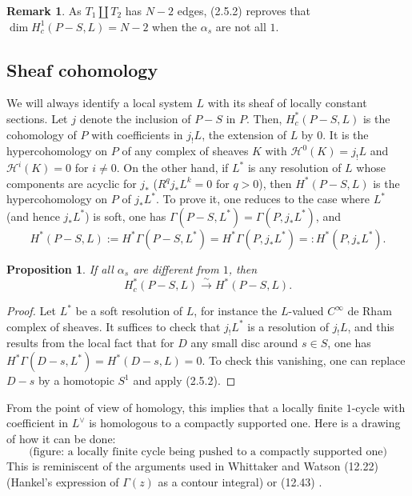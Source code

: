 \documentclass[12pt,a4paper]{article}
\theoremstyle{plain}
\newtheorem{proposition}[theorem]{Proposition}
\theoremstyle{definition}
\newtheorem{remark}[theorem]{Remark}
\theoremstyle{remark}
\numberwithin{equation}{section}
\begin{document}
\begin{remark}
As $T_1 \amalg T_2$ has $N-2$ edges, (2.5.2) reproves that $\dim H^1_c(P-S, L) = N-2$ when the $\alpha_s$ are not all $1$.
\end{remark}

\subsection{Sheaf cohomology}
We will always identify a local system $L$ with its sheaf of locally constant sections. Let $j$ denote the inclusion of $P-S$ in $P$. Then, $H^*_c(P-S, L)$ is the cohomology of $P$ with coefficients in $j_!L$, the extension of $L$ by $0$. It is the hypercohomology on $P$ of any complex of sheaves $K$ with $\mathscr{H}^0(K) = j_!L$ and $\mathscr{H}^i(K) = 0$ for $i \neq 0$. On the other hand, if $L^*$ is any resolution of $L$ whose components are acyclic for $j_*$ ($R^qj_*L^k = 0$ for $q > 0$), then $H^*(P-S, L)$ is the hypercohomology on $P$ of $j_*L^*$. To prove it, one reduces to the case where $L^*$ (and hence $j_*L^*$) is soft, one has $\Gamma(P-S, L^*) = \Gamma(P, j_*L^*)$, and
\[
H^*(P-S, L) := H^*\Gamma(P-S, L^*) = H^*\Gamma(P, j_*L^*) =: H^*(P, j_*L^*).
\]

\begin{proposition}\label{prop:2.6.1}
If all $\alpha_s$ are different from $1$, then
\[
H^*_c(P-S, L) \xrightarrow{\sim} H^*(P-S, L).
\]
\end{proposition}

\begin{proof}
Let $L^*$ be a soft resolution of $L$, for instance the $L$-valued $C^\infty$ de Rham complex of sheaves. It suffices to check that $j_!L^*$ is a resolution of $j_!L$, and this results from the local fact that for $D$ any small disc around $s \in S$, one has $H^*\Gamma(D-s, L^*) = H^*(D-s, L) = 0$. To check this vanishing, one can replace $D-s$ by a homotopic $S^1$ and apply (2.5.2).
\end{proof}

From the point of view of homology, this implies that a locally finite $1$-cycle with coefficient in $L^\vee$ is homologous to a compactly supported one. Here is a drawing of how it can be done:
\[
\text{(figure: a locally finite cycle being pushed to a compactly supported one)}
\]
This is reminiscent of the arguments used in Whittaker and Watson (12.22) (Hankel's expression of $\Gamma(z)$ as a contour integral) or (12.43) \cite{WW}.
\end{document}
